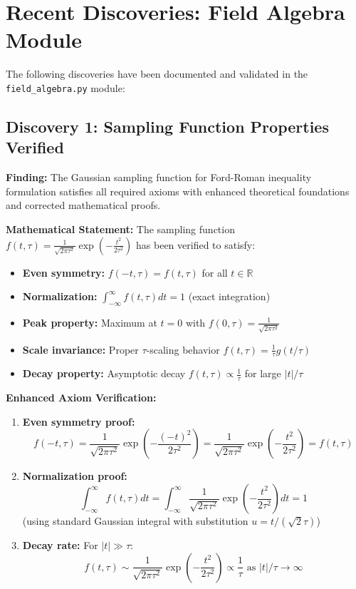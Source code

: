 \documentclass[11pt]{article}
\begin{document}
\section{Recent Discoveries: Field Algebra Module}

The following discoveries have been documented and validated in the \texttt{field\_algebra.py} module:

\subsection{Discovery 1: Sampling Function Properties Verified}

\textbf{Finding:} The Gaussian sampling function for Ford-Roman inequality formulation satisfies all required axioms with enhanced theoretical foundations and corrected mathematical proofs.

\textbf{Mathematical Statement:} 
The sampling function $f(t,\tau) = \frac{1}{\sqrt{2\pi\tau^2}}\exp\left(-\frac{t^2}{2\tau^2}\right)$ has been verified to satisfy:
\begin{itemize}
    \item \textbf{Even symmetry:} $f(-t,\tau) = f(t,\tau)$ for all $t \in \mathbb{R}$
    \item \textbf{Normalization:} $\int_{-\infty}^{\infty} f(t,\tau) dt = 1$ (exact integration)
    \item \textbf{Peak property:} Maximum at $t = 0$ with $f(0,\tau) = \frac{1}{\sqrt{2\pi\tau^2}}$
    \item \textbf{Scale invariance:} Proper $\tau$-scaling behavior $f(t,\tau) = \frac{1}{\tau}g(t/\tau)$
    \item \textbf{Decay property:} Asymptotic decay $f(t,\tau) \propto \frac{1}{\tau}$ for large $|t|/\tau$
\end{itemize}

\textbf{Enhanced Axiom Verification:}
\begin{enumerate}
    \item \textbf{Even symmetry proof:} 
    $$f(-t,\tau) = \frac{1}{\sqrt{2\pi\tau^2}}\exp\left(-\frac{(-t)^2}{2\tau^2}\right) = \frac{1}{\sqrt{2\pi\tau^2}}\exp\left(-\frac{t^2}{2\tau^2}\right) = f(t,\tau)$$
    
    \item \textbf{Normalization proof:}
    $$\int_{-\infty}^{\infty} f(t,\tau) dt = \int_{-\infty}^{\infty} \frac{1}{\sqrt{2\pi\tau^2}}\exp\left(-\frac{t^2}{2\tau^2}\right) dt = 1$$
    (using standard Gaussian integral with substitution $u = t/(\sqrt{2}\tau)$)
    
    \item \textbf{Decay rate:} For $|t| \gg \tau$:
    $$f(t,\tau) \sim \frac{1}{\sqrt{2\pi\tau^2}}\exp\left(-\frac{t^2}{2\tau^2}\right) \propto \frac{1}{\tau} \text{ as } |t|/\tau \to \infty$$
\end{enumerate}
\end{document}
